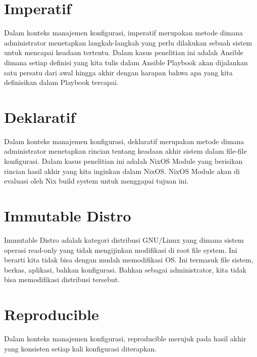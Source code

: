 \documentclass[10pt,]{report}
\begin{document}
\section{Imperatif}
\begin{adjustwidth}{20pt}{}
	\vspace{-3mm}
	Dalam konteks manajemen konfigurasi, imperatif merupakan metode dimana
	administrator menetapkan langkah-langkah yang perlu dilakukan sebuah sistem
	untuk mencapai keadaan tertentu. Dalam kasus penelitian ini adalah Ansible
	dimana setiap definisi yang kita tulis dalam Ansible Playbook akan dijalankan
	satu persatu dari awal hingga akhir dengan harapan bahwa apa yang kita
	definisikan dalam Playbook tercapai.
\end{adjustwidth}
\section{Deklaratif}
\begin{adjustwidth}{20pt}{}
	\vspace{-3mm}
	Dalam konteks manajemen konfigurasi, deklaratif merupakan metode dimana
	administrator menetapkan rincian tentang keadaan akhir sistem dalam file-file
	konfigurasi. Dalam kasus penelitian ini adalah NixOS Module yang berisikan
	rincian hasil akhir yang kita inginkan dalam NixOS. NixOS Module akan di
	evaluasi oleh Nix build system untuk menggapai tujuan ini.
\end{adjustwidth}
\section{Immutable Distro}
\begin{adjustwidth}{20pt}{}
	\vspace{-3mm}
	Immutable Distro adalah kategori distribusi GNU/Linux yang dimana sistem
	operasi read-only yang tidak mengijinkan modifikasi di root file system. Ini
	berarti kita tidak bisa dengan mudah memodifikasi OS. Ini termasuk file
	sistem, berkas, aplikasi, bahkan konfigurasi. Bahkan sebagai administrator,
	kita tidak bisa memodifikasi distribusi tersebut.
\end{adjustwidth}
\section{Reproducible}
\begin{adjustwidth}{20pt}{}
	\vspace{-3mm}
	Dalam konteks manajemen konfigurasi, reproducible merujuk pada hasil akhir
	yang konsisten setiap kali konfigurasi diterapkan.
\end{adjustwidth}
\end{document}
